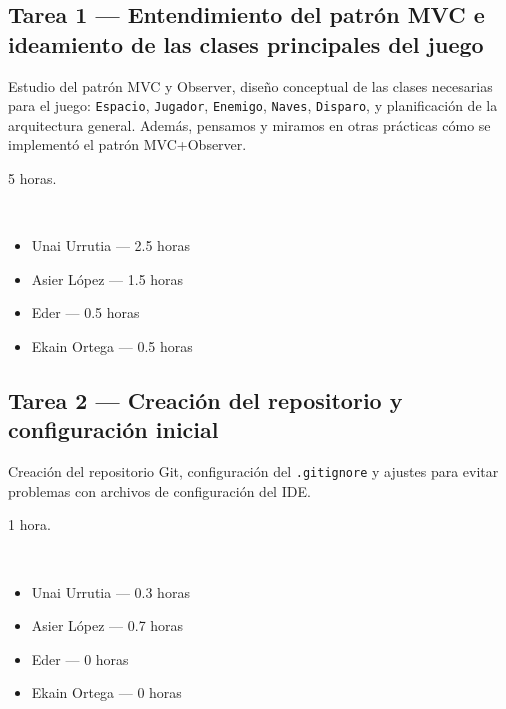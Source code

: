 \documentclass[12pt, a4paper]{article}
\begin{document}
\subsection*{Tarea 1 — Entendimiento del patrón MVC e ideamiento de las clases principales del juego}
\begin{description}[leftmargin=2em, style=nextline]
    \item[\textbf{Descripción:}] Estudio del patrón MVC y Observer, diseño conceptual de las clases necesarias para el juego: \texttt{Espacio}, \texttt{Jugador}, \texttt{Enemigo}, \texttt{Naves}, \texttt{Disparo}, y planificación de la arquitectura general. Además, pensamos y miramos en otras prácticas cómo se implementó el patrón MVC+Observer.
    \item[\textbf{Tiempo:}] 5 horas.
    \item[\textbf{Responsables y dedicación:}]~
        \begin{itemize}[leftmargin=1em, nosep]
            \item Unai Urrutia — 2.5 horas
            \item Asier López — 1.5 horas
            \item Eder — 0.5 horas
            \item Ekain Ortega — 0.5 horas
        \end{itemize}
\end{description}

\vspace{0.8em}

\subsection*{Tarea 2 — Creación del repositorio y configuración inicial}
\begin{description}[leftmargin=2em, style=nextline]
    \item[\textbf{Descripción:}] Creación del repositorio Git, configuración del \texttt{.gitignore} y ajustes para evitar problemas con archivos de configuración del IDE.
    \item[\textbf{Tiempo:}] 1 hora.
    \item[\textbf{Responsables y dedicación:}]~
        \begin{itemize}[leftmargin=1em, nosep]
            \item Unai Urrutia — 0.3 horas
            \item Asier López — 0.7 horas
            \item Eder — 0 horas
            \item Ekain Ortega — 0 horas
        \end{itemize}
\end{description}
\end{document}
